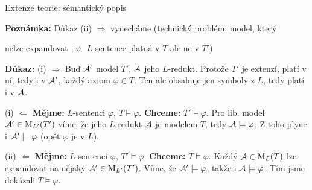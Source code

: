 \documentclass{beamer}
\begin{document}
\begin{frame}{Extenze teorie: sémantický popis}

    
    {\small \textbf{Poznámka:} Důkaz \alert{(ii) \Large $\Rightarrow$} vynecháme (technický problém: model, který

    \vspace{-11pt} nelze expandovat $\rightsquigarrow$ $L$-sentence platná v $T$ ale ne v $T'$)}

    \vspace{-3pt}
    \textbf{Důkaz:}
    \alert{(i) \Large $\Rightarrow$} Buď $\mathcal{A}'$ model $T'$, $\mathcal{A}$ jeho $L$-redukt. Protože $T'$ je extenzí, platí v ní, tedy i v $\mathcal{A}'$, každý axiom $\varphi\in T$. Ten ale obsahuje jen symboly z $L$, tedy platí i v $\mathcal{A}$.
    
    \vspace{-3pt}
    \alert{(i) \Large $\Leftarrow$} \textbf{Mějme:} $L$-sentenci $\varphi$,  $T\models\varphi$. \textbf{Chceme:} $T'\models\varphi$. Pro lib. model $\mathcal{A}'\in\operatorname{M}_{L'}(T')$ víme, že jeho $L$-redukt $\mathcal{A}$ je modelem $T$, tedy $\mathcal{A}\models\varphi$. Z toho plyne i $\mathcal{A}'\models\varphi$ (opět $\varphi$ je v $L$).
    
    \vspace{-3pt}
    \alert{(ii) \Large $\Leftarrow$} \textbf{Mějme:} $L$-sentenci $\varphi$,  $T'\models\varphi$. \textbf{Chceme:} $T\models\varphi$. Každý $\mathcal{A}\in\operatorname{M}_L(T)$ lze expandovat na nějaký $\mathcal{A}'\in\operatorname{M}_{L'}(T')$. Víme, že $\mathcal{A}'\models\varphi$, takže i $\mathcal{A}\models\varphi$. Tím jsme dokázali $T\models\varphi$.    
    \hfill\qedsymbol
    
\end{frame}
\end{document}
